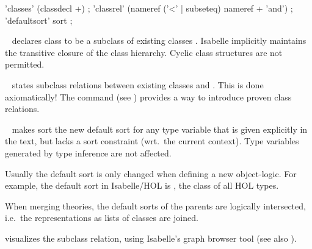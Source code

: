 \begin{isabellebody}
\begin{isamarkuptext}
  \begin{rail}
    'classes' (classdecl +)
    ;
    'classrel' (nameref ('<' | subseteq) nameref + 'and')
    ;
    'defaultsort' sort
    ;
  \end{rail}

  \begin{description}

  \item \hyperlink{command.classes}{\mbox{}}~ declares class
   to be a subclass of existing classes .
  Isabelle implicitly maintains the transitive closure of the class
  hierarchy.  Cyclic class structures are not permitted.

  \item \hyperlink{command.classrel}{\mbox{}}~ states subclass
  relations between existing classes  and .
  This is done axiomatically!  The \hyperlink{command.instance}{\mbox{}} command
  (see ) provides a way to introduce proven class
  relations.

  \item \hyperlink{command.defaultsort}{\mbox{}}~ makes sort  the
  new default sort for any type variable that is given explicitly in
  the text, but lacks a sort constraint (wrt.\ the current context).
  Type variables generated by type inference are not affected.

  Usually the default sort is only changed when defining a new
  object-logic.  For example, the default sort in Isabelle/HOL is
  , the class of all HOL types.  %

  When merging theories, the default sorts of the parents are
  logically intersected, i.e.\ the representations as lists of classes
  are joined.

  \item \hyperlink{command.class-deps}{\mbox{}} visualizes the subclass relation,
  using Isabelle's graph browser tool (see also \cite{isabelle-sys}).


\end{description}
\end{isamarkuptext}
\end{isabellebody}
